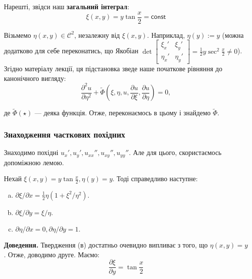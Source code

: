 \documentclass{hw_template}
\begin{document}
Нарешті, звідси наш \textbf{загальний інтеграл}:
\begin{equation*}
    \boxed{\xi(x,y) = y\tan \frac{x}{2} = \mathsf{const}}
\end{equation*}

Візьмемо $\eta(x,y) \in \mathcal{C}^2$, незалежну від $\xi(x,y)$. Наприклад, $\eta(y) := y$ (можна додатково для себе переконатись, що Якобіан $\det \begin{bmatrix}
    \xi_x' & \xi_y' \\
    \eta_x' & \eta_y'
\end{bmatrix} = \frac{1}{2}y \sec^2 \frac{x}{2} \neq 0$). Згідно матеріалу лекції, ця підстановка зведе наше початкове рівняння до канонічного вигляду:
\begin{equation*}
    \frac{\partial^2 u}{\partial \eta^2} + \widetilde{\Phi}\left(\xi,\eta,u,\frac{\partial u}{\partial \xi}, \frac{\partial u}{\partial \eta}\right) = 0,
\end{equation*}

де $\widetilde{\Phi}(\star)$ --- деяка функція. Отже, переконаємось в цьому і знайдемо $\widetilde{\Phi}$. 

\subsubsection{Знаходження часткових похідних}

Знаходимо похідні $u_x',u_y',u_{xx}'',u_{xy}'',u_{yy}''$. Але для цього, скористаємось допоміжною лемою.

\begin{lemma}
    Нехай $\xi(x,y) = y \tan \frac{x}{2}, \eta(y) = y$. Тоді справедливо наступне:
    \begin{enumerate}[(a)]
        \item $\partial \xi/\partial x = \frac{1}{2}\eta\left(1+\xi^2/\eta^2\right)$.
        \item $\partial \xi/\partial y = \xi/\eta$.
        \item $\partial \eta/\partial x = 0, \partial \eta/\partial y = 1$.
    \end{enumerate}
\end{lemma}

\textbf{Доведення.} Твердження (в) достатньо очевидно випливає з того, що $\eta(x,y)=y$. Отже, доводимо друге. Маємо:
\begin{equation*}
    \frac{\partial \xi}{\partial y} = \tan \frac{x}{2}
\end{equation*} 
\end{document}
